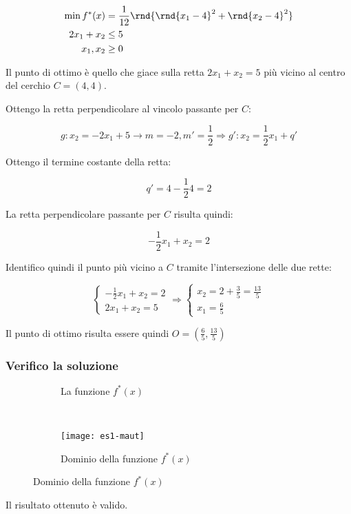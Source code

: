 \documentclass[\main/main.tex]{subfiles}
\begin{document}
\begin{align*}
  \min f^*(x) & = \frac{1}{12}\rnd{\rnd{x_1-4}^2 + \rnd{x_2-4}^2} \\
  2x_1 + x_2  & \leq 5                                            \\
  x_1, x_2    & \geq 0
\end{align*}

Il punto di ottimo è quello che giace sulla retta $2x_1+x_2=5$ più vicino al centro del cerchio $C = (4,4)$.

Ottengo la retta perpendicolare al vincolo passante per $C$:

\[
  g: x_2 = -2x_1 +5 \rightarrow m = -2, m' = \frac{1}{2} \Rightarrow  g': x_2 = \frac{1}{2}x_1 + q'
\]

Ottengo il termine costante della retta:

\[
  q' = 4 - \frac{1}{2}4 = 2
\]

La retta perpendicolare passante per $C$ risulta quindi:

\[
  -\frac{1}{2}x_1 + x_2 = 2
\]

Identifico quindi il punto più vicino a $C$ tramite l'intersezione delle due rette:

\[
  \begin{cases}
    -\frac{1}{2}x_1 + x_2 = 2 \\
    2x_1 + x_2  = 5
  \end{cases}
  \Rightarrow
  \begin{cases}
    x_2 = 2+\frac{3}{5} = \frac{13}{5} \\
    x_1 = \frac{6}{5}
  \end{cases}
\]

Il punto di ottimo risulta essere quindi $O = (\frac{6}{5}, \frac{13}{5})$

\subsubsection*{Verifico la soluzione}

\begin{figure}
  \begin{subfigure}{0.45\textwidth}
    \caption{La funzione $f^*(x)$}
  \end{subfigure}
  ~
  \begin{subfigure}{0.45\textwidth}
    \texttt{[image: es1-maut]}
    \caption{Dominio della funzione $f^*(x)$}
  \end{subfigure}
\end{figure}

Il risultato ottenuto è valido.
\end{document}
